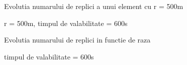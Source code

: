 \documentclass{beamer}
\begin{document}
\begin{frame}{Evolutia numarului de replici a unui element cu r = 500m}
	\begin{figure}[t]
		\centering
		\def\svgwidth{\columnwidth}
		
	\end{figure}
	
	\centerline{r = 500m, timpul de valabilitate = 600s}
\end{frame}
\begin{frame}{Evolutia numarului de replici in functie de raza}
	\begin{figure}[t]
		\centering
		\def\svgwidth{\columnwidth}
		
	\end{figure}
	
	\centerline{timpul de valabilitate = 600s}
\end{frame}
\end{document}
